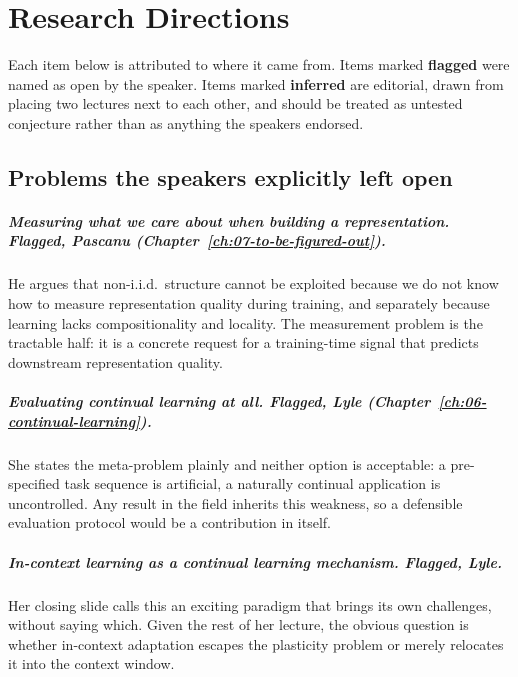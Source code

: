 \chapter{Research Directions}
\label{ch:research-directions}

Each item below is attributed to where it came from. Items marked \textbf{flagged} were named as
open by the speaker. Items marked \textbf{inferred} are editorial, drawn from placing two lectures
next to each other, and should be treated as untested conjecture rather than as anything the
speakers endorsed.

\section*{Problems the speakers explicitly left open}

\paragraph{Measuring what we care about when building a representation. Flagged, Pascanu
(Chapter~\ref{ch:07-to-be-figured-out}).} He argues that non-i.i.d.\ structure cannot be exploited
because we do not know how to measure representation quality during training, and separately because
learning lacks compositionality and locality. The measurement problem is the tractable half: it is a
concrete request for a training-time signal that predicts downstream representation quality.

\paragraph{Evaluating continual learning at all. Flagged, Lyle
(Chapter~\ref{ch:06-continual-learning}).} She states the meta-problem plainly and neither option is
acceptable: a pre-specified task sequence is artificial, a naturally continual application is
uncontrolled. Any result in the field inherits this weakness, so a defensible evaluation protocol
would be a contribution in itself.

\paragraph{In-context learning as a continual learning mechanism. Flagged, Lyle.} Her closing slide
calls this an exciting paradigm that brings its own challenges, without saying which. Given the rest
of her lecture, the obvious question is whether in-context adaptation escapes the plasticity problem
or merely relocates it into the context window.

